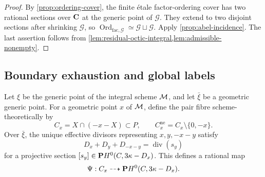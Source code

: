 \begin{proof}
By \cref{prop:ordering-cover}, the finite
\'etale factor-ordering cover has two rational sections over $\mathbf C$ at the
generic point of $\mathscr G$.  They extend to two disjoint sections after
shrinking $\mathscr G$, so
$\operatorname{Ord}_{\mathrm{fac},\mathscr G}
 \simeq\mathscr G\sqcup\mathscr G$.
Apply \cref{prop:abel-incidence}.  The last assertion follows from
\cref{lem:residual-octic-integral,lem:admissible-nonempty}.
\end{proof}

\subsection{Boundary exhaustion and global labels}

Let $\xi$ be the generic point of the integral scheme $\mathcal M$, and let
$\bar\xi$ be a geometric generic point.  For a geometric point $x$ of
$\mathcal M$, define the pair fibre scheme-theoretically by
\[
 C_x=X\cap(-x-X)\subset P,
 \qquad C_x^{\mathrm{ne}}=C_x\setminus\{0,-x\}.
\]
Over $\bar\xi$, the unique effective divisors representing $x,y,-x-y$
satisfy
\begin{equation}
 D_x+D_y+D_{-x-y}=\operatorname{div}(s_y)
\label{eq:pair-zero-divisor}
\end{equation}
for a projective section $[s_y]\in\mathbf P H^0(C,3\kappa-D_x)$.  This defines a
rational map
\[
 \Psi:C_x\dashrightarrow\mathbf P H^0(C,3\kappa-D_x).
\]
